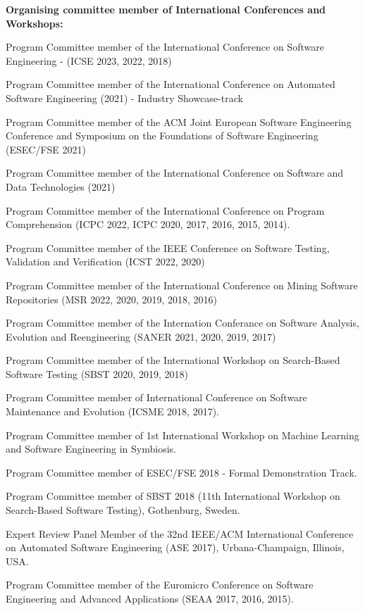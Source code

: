 \documentclass[10pt]{article}
\newcommand\on[1]{\nbc{ON}{#1}{red}} %
\begin{document}
\textbf{Organising committee member of International Conferences and Workshops:}
\begin{innerlist}
\item Program Committee member of the International Conference on Software Engineering - (ICSE 2023, 2022, 2018)
\item Program Committee member of the  International Conference on Automated Software Engineering (2021) - Industry Showcase-track
\item Program Committee member of the  ACM Joint European Software Engineering Conference and Symposium on the Foundations of Software Engineering (ESEC/FSE 2021)
\item Program Committee member of the  International Conference on Software and Data Technologies (2021)
\item Program Committee member of the International Conference on Program Comprehension (ICPC 2022, ICPC 2020, 2017, 2016, 2015, 2014).
\item Program Committee member of  the IEEE Conference on Software Testing, Validation and Verification (ICST 2022, 2020)  
\item Program Committee member of  the International Conference on Mining Software Repositories (MSR 2022, 2020, 2019, 2018, 2016)  
\item Program Committee member of  the Internation Conferance on Software Analysis, Evolution and Reengineering (SANER 2021, 2020, 2019, 2017)
\item Program Committee member of  the  International Workshop on Search-Based Software Testing (SBST 2020, 2019, 2018)   
\item Program Committee member of  International Conference on Software Maintenance and Evolution (ICSME 2018, 2017).
\item Program Committee member of 1st International Workshop on Machine Learning and Software Engineering in Symbiosis.
\item Program Committee member of  ESEC/FSE 2018 - Formal Demonstration Track.
\item Program Committee member of SBST 2018 (11th International Workshop on Search-Based Software Testing), Gothenburg, Sweden.
\item Expert Review Panel Member of the 32nd IEEE/ACM International Conference on Automated Software Engineering (ASE 2017), Urbana-Champaign, Illinois, USA.
\item Program Committee member of the Euromicro Conference on Software Engineering and Advanced Applications (SEAA 2017, 2016, 2015).

\end{innerlist}
\end{document}
